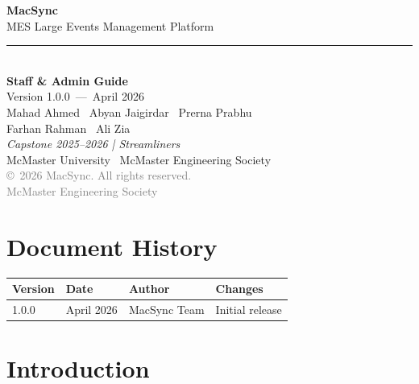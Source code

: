 \documentclass[12pt, twoside]{report}
\newcommand{\version}{1.0.0}
\newcommand{\releasedate}{April 2026}
\begin{document}
\begin{titlepage}
  \centering
  \vspace*{2cm}


  {\Huge\bfseries\color{MacSyncPrimary} MacSync}\\[0.4cm]
  {\Large\color{DarkGray} MES Large Events Management Platform}\\[0.2cm]
  \noindent\rule{\textwidth}{1pt}\\[0.4cm]
  {\LARGE\bfseries Staff \& Admin Guide}\\[0.2cm]
  {\large Version \version\ ---\ \releasedate}\\[2cm]

  {\large Mahad Ahmed \textbullet\ Abyan Jaigirdar \textbullet\ Prerna Prabhu\\
  Farhan Rahman \textbullet\ Ali Zia}\\[0.4cm]
  {\normalsize\textit{Capstone 2025--2026 | Streamliners}}\\[0.6cm]
  {\large McMaster University \textbullet\ McMaster Engineering Society}\\[1cm]

  \vfill
  {\small\textcolor{gray}{\copyright\ 2026 MacSync. All rights reserved.\\
  McMaster Engineering Society}}
\end{titlepage}

\setcounter{page}{1}

\chapter*{Document History}
\begin{longtable}{@{} p{2cm} p{2.5cm} p{4cm} p{5cm} @{}}
  \toprule
  \textbf{Version} & \textbf{Date} & \textbf{Author} & \textbf{Changes} \\
  \midrule
  \endhead
  1.0.0 & April 2026 & MacSync Team & Initial release \\
  \bottomrule
\end{longtable}

\tableofcontents
\clearpage

\setcounter{page}{1}


\chapter{Introduction}
\end{document}
